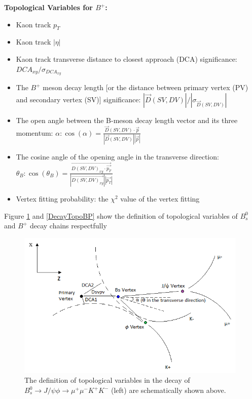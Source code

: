 \textbf{Topological Variables for $B^+$:}
\begin{itemize}
\item Kaon track $p_T$
\item Kaon track $|\eta|$
\item Kaon track transverse distance to closest approach (DCA) significance: $DCA_{xy}/\sigma_{DCA_{xy}}$ 
\item The $B^+$ meson decay length [or the distance between primary vertex (PV) and secondary vertex (SV)] significance: $|\vec{D}(SV,DV)|/|\sigma_{\vec{D}(SV,DV)}|$
\item The open angle between the B-meson decay length vector and its three momentum: $\alpha: \cos(\alpha) = \frac{\vec{D}(SV,DV) \cdot \vec{p}}{|\vec{D}(SV,DV)||\vec{p}|}$
\item The cosine angle of the opening angle in the transverse direction:  $\theta_B: \cos(\theta_B) = \frac{\vec{D(SV,DV)_{xy} \cdot \vec{p_T}}}{|\vec{D(SV,DV)_{xy}}||\vec{p_T}|}$
\item Vertex fitting probability: the $\chi^2$ value of the vertex fitting
\end{itemize}

Figure \ref{DecayTopoBs} and \ref{DecayTopoBP} show the definition of topological variables of $B^0_s$ and $B^+$ decay chains respectfully 

\begin{figure}[h]
\begin{center}
\includegraphics[width= 0.98\textwidth]{Figures/Chapter4/BsDecay.png}
\caption{The definition of topological variables in the decay of $B^0_s \rightarrow J/\psi \phi \rightarrow \mu^+\mu^- K^+K^-$ (left) are schematically shown above.}
\label{DecayTopoBs}
\end{center}
\end{figure}


